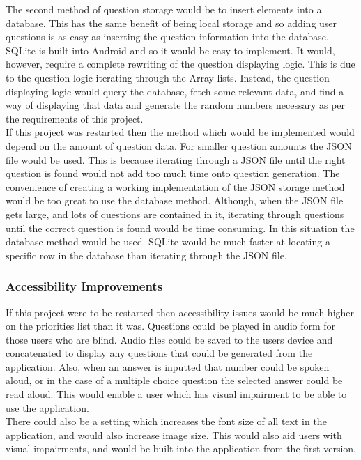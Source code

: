 \documentclass{article}
\begin{document}
The second method of question storage would be to insert elements into a database. This has the same benefit of being local storage and so adding user questions is as easy as inserting the question information into the database. SQLite is built into Android and so it would be easy to implement. It would, however, require a complete rewriting of the question displaying logic. This is due to the question logic iterating through the Array lists. Instead, the question displaying logic would query the database, fetch some relevant data, and find a way of displaying that data and generate the random numbers necessary as per the requirements of this project. \\

If this project was restarted then the method which would be implemented would depend on the amount of question data. For smaller question amounts the JSON file would be used. This is because iterating through a JSON file until the right question is found would not add too much time onto question generation. The convenience of creating a working implementation of the JSON storage method would be too great to use the database method. Although, when the JSON file gets large, and lots of questions are contained in it, iterating through questions until the correct question is found would be time consuming. In this situation the database method would be used. SQLite would be much faster at locating a specific row in the database than iterating through the JSON file. \\

\subsubsection{Accessibility Improvements}

If this project were to be restarted then accessibility issues would be much higher on the priorities list than it was. Questions could be played in audio form for those users who are blind. Audio files could be saved to the users device and concatenated to display any questions that could be generated from the application. Also, when an answer is inputted that number could be spoken aloud, or in the case of a multiple choice question the selected answer could be read aloud. This would enable a user which has visual impairment to be able to use the application. \\

There could also be a setting which increases the font size of all text in the application, and would also increase image size. This would also aid users with visual impairments, and would be built into the application from the first version. \\
\end{document}
